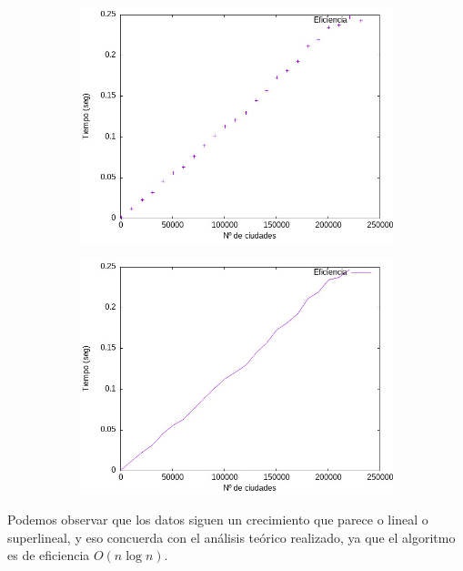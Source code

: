 \documentclass{article}
\begin{document}
\begin{figure}[H]
    \begin{subfigure}{0.4\textwidth}
        \centering
        \includegraphics[scale = 0.40]{P3/pointsDyV.jpeg}
    \end{subfigure}\hfill
    \begin{subfigure}{0.4\textwidth}
        \centering
        \includegraphics[scale = 0.40]{P3/linesDyV.jpeg}
    \end{subfigure}
\end{figure}

    Podemos observar que los datos siguen un crecimiento que parece o lineal o superlineal, y eso concuerda con el análisis teórico realizado, ya que el algoritmo es de eficiencia $O(n \log{n})$.
\end{document}
